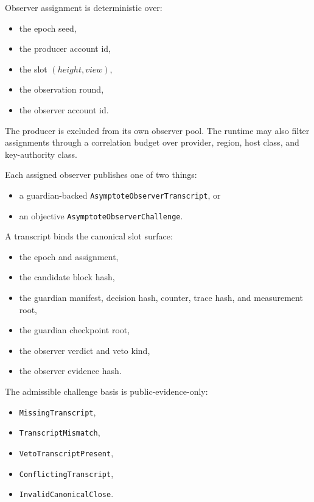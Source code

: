 \documentclass[11pt]{article}
\newcommand{\code}[1]{\texttt{#1}}
\begin{document}
Observer assignment is deterministic over:

\begin{itemize}[leftmargin=1.5em]
\item the epoch seed,
\item the producer account id,
\item the slot \((height, view)\),
\item the observation round,
\item the observer account id.
\end{itemize}

The producer is excluded from its own observer pool. The runtime may also
filter assignments through a correlation budget over provider, region, host
class, and key-authority class.

Each assigned observer publishes one of two things:

\begin{itemize}[leftmargin=1.5em]
\item a guardian-backed \code{AsymptoteObserverTranscript}, or
\item an objective \code{AsymptoteObserverChallenge}.
\end{itemize}

A transcript binds the canonical slot surface:

\begin{itemize}[leftmargin=1.5em]
\item the epoch and assignment,
\item the candidate block hash,
\item the guardian manifest, decision hash, counter, trace hash, and
measurement root,
\item the guardian checkpoint root,
\item the observer verdict and veto kind,
\item the observer evidence hash.
\end{itemize}

The admissible challenge basis is public-evidence-only:

\begin{itemize}[leftmargin=1.5em]
\item \code{MissingTranscript},
\item \code{TranscriptMismatch},
\item \code{VetoTranscriptPresent},
\item \code{ConflictingTranscript},
\item \code{InvalidCanonicalClose}.
\end{itemize}
\end{document}
